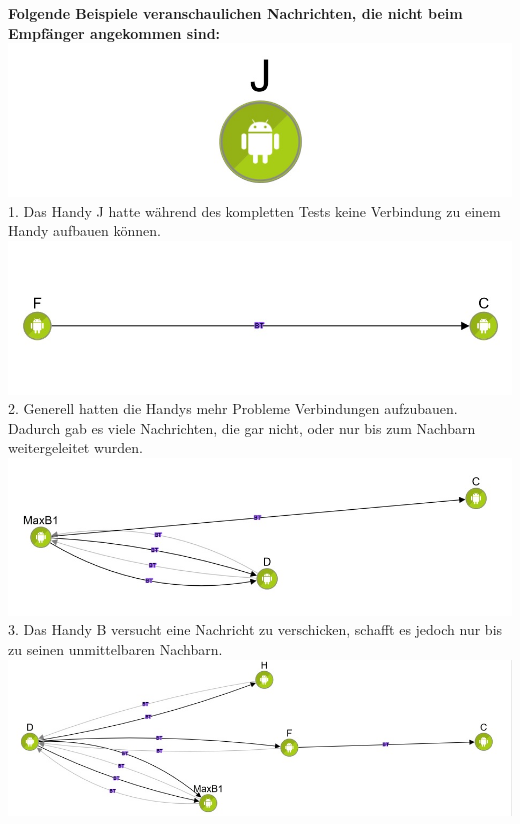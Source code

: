 \textbf{Folgende Beispiele veranschaulichen Nachrichten, die nicht beim
Empfänger angekommen sind:}\\
\includegraphics[width=1.0\textwidth]{belege/grosstests/Bilder/Test2Misserfolg1.jpg}\\ 1. Das
Handy J hatte während des kompletten Tests keine Verbindung zu einem
Handy aufbauen können.\\
\includegraphics[width=1.0\textwidth]{belege/grosstests/Bilder/Test2Misserfolg3.jpg}\\ 2.
Generell hatten die Handys mehr Probleme Verbindungen aufzubauen.
Dadurch gab es viele Nachrichten, die gar nicht, oder nur bis zum
Nachbarn weitergeleitet wurden.\\
\includegraphics[width=1.0\textwidth]{belege/grosstests/Bilder/Test2Misserfolg4.jpg} \\3. Das
Handy B versucht eine Nachricht zu verschicken, schafft es jedoch nur
bis zu seinen unmittelbaren Nachbarn.\\
\includegraphics[width=1.0\textwidth]{belege/grosstests/Bilder/Test2Misserfolg5.jpg}\\
